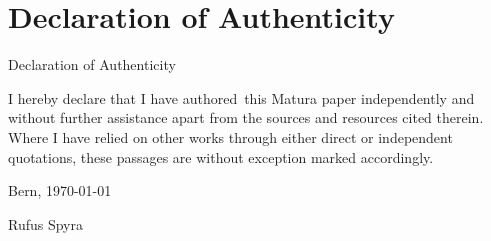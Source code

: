 \chapter*{Declaration of Authenticity}
Declaration of Authenticity

I hereby declare that I have authored this Matura paper independently and without further assistance apart from the sources and resources cited therein. Where I have relied on other works through either direct or independent quotations, these passages are without exception marked accordingly.

Bern, \today \vspace{2cm}

Rufus Spyra